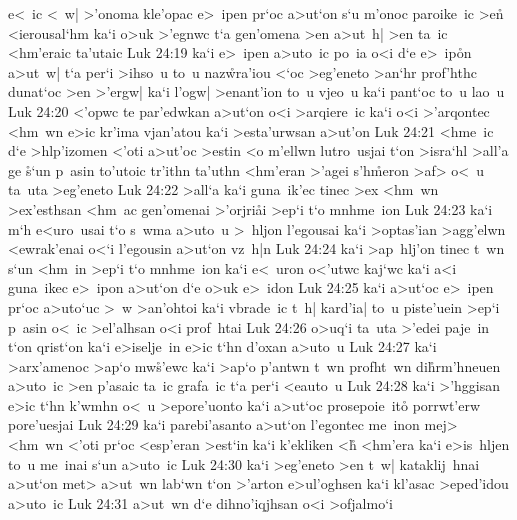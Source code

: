e<~ic
<~w|
>'onoma
kle'opac
e>~ipen
pr`oc
a>ut`on
s`u
m'onoc
paroike~ic
>e\r{n}
<ierousal`hm
ka`i
o>uk
>'egnwc
t`a
gen'omena
>en
a>ut~h|
>en
ta~ic
<hm'eraic
ta'utaic\bibvsend
\vs Luk 24:19
ka`i
e>~ipen
a>uto~ic
po~ia
o<i
d`e
e>~ip\r{o}n
a>ut~w|
t`a
per`i
>ihso~u
to~u
naz\r{w}ra'iou
<`oc
>eg'eneto
>an`hr
prof'hthc
dunat`oc
>en
>'ergw|
ka`i
l'ogw|
>enant'ion
to~u
vjeo~u
ka`i
pant`oc
to~u
lao~u\bibvsend
\vs Luk 24:20
<'opwc
te
par'edwkan
a>ut`on
o<i
>arqiere~ic
ka`i
o<i
>'arqontec
<hm~wn
e>ic
kr'ima
vjan'atou
ka`i
>esta'urwsan
a>ut'on\bibvsend
\vs Luk 24:21
<hme~ic
d`e
>hlp'izomen
<'oti
a>ut'oc
>estin
<o
m'ellwn
lutro~usjai
t`on
>isra`hl
>all'a
ge
\r{s}`un
p~asin
to'utoic
tr'ithn
ta'uthn
<hm'eran
>'agei
s'h\r{m}eron
>af>
o<~u
ta~uta
>eg'eneto\bibvsend
\vs Luk 24:22
>all`a
ka`i
guna~ik'ec
tinec
>ex
<hm~wn
>ex'esthsan
<hm~ac
gen'omenai
>'orjri\r{a}i
>ep`i
t`o
mnhme~ion\bibvsend
\vs Luk 24:23
ka`i
m`h
e<uro~usai
t`o
s~wma
a>uto~u
>~hljon
l'egousai
ka`i
>optas'ian
>agg'elwn
<ewrak'enai
o<`i
l'egousin
a>ut`on
vz~h|n\bibvsend
\vs Luk 24:24
ka`i
>ap~hlj'on
tinec
t~wn
s`un
<hm~in
>ep`i
t`o
mnhme~ion
ka`i
e<~uron
o<'utwc
kaj`wc
ka`i
a<i
guna~ikec
e>~ipon
a>ut`on
d`e
o>uk
e>~idon\bibvsend
\vs Luk 24:25
ka`i
a>ut`oc
e>~ipen
pr`oc
a>uto`uc
>~w
>an'ohtoi
ka`i
vbrade~ic
t~h|
kard'ia|
to~u
piste'uein
>ep`i
p~asin
o<~ic
>el'alhsan
o<i
prof~htai\bibvsend
\vs Luk 24:26
o>uq`i
ta~uta
>'edei
paje~in
t`on
qrist`on
ka`i
e>iselje~in
e>ic
t`hn
d'oxan
a>uto~u\bibvsend
\vs Luk 24:27
ka`i
>arx'amenoc
>ap`o
mw\r{s}'ewc
ka`i
>ap`o
p'antwn
t~wn
profht~wn
di\r{h}rm'hneuen
a>uto~ic
>en
p'asaic
ta~ic
grafa~ic
t`a
per`i
<eauto~u\bibvsend
\vs Luk 24:28
ka`i
>'hggisan
e>ic
t`hn
k'wmhn
o<~u
>epore'uonto
ka`i
a>ut`oc
prosepoie~ito\r{}
porrwt'erw
pore'uesjai\bibvsend
\vs Luk 24:29
ka`i
parebi'asanto
a>ut`on
l'egontec
me~inon
mej>
<hm~wn
<'oti
pr`oc
<esp'eran
>est`in
ka`i
k'ekliken
<h\r{}
<hm'era
ka`i
e>is~hljen
to~u
me~inai
s`un
a>uto~ic\bibvsend
\vs Luk 24:30
ka`i
>eg'eneto
>en
t~w|
kataklij~hnai
a>ut`on
met>
a>ut~wn
lab`wn
t`on
>'arton
e>ul'oghsen
ka`i
kl'asac
>eped'idou
a>uto~ic\bibvsend
\vs Luk 24:31
a>ut~wn
d`e
dihno'iqjhsan
o<i
>ofjalmo`i
